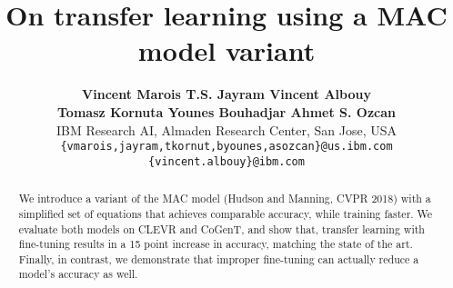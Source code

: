 \documentclass{article}
\title{On transfer learning using a MAC model variant}
\author{
	\textbf{\null\hfill Vincent Marois \hfill T.S. Jayram \hfill Vincent Albouy  \hfill\null}\\
	\textbf{\null\hfill Tomasz Kornuta \hfill Younes Bouhadjar \hfill Ahmet S. Ozcan \hfill\null}\\
	IBM Research AI, Almaden Research Center, San Jose, USA\\
	\texttt{\{vmarois,jayram,tkornut,byounes,asozcan\}@us.ibm.com}\\
	\texttt{\{vincent.albouy\}@ibm.com}\\
}
\begin{document}

\maketitle

\vskip -0.5cm
\begin{abstract}
We introduce a variant of the MAC model (Hudson and Manning, CVPR 2018) with a simplified set of equations that achieves comparable accuracy, while training faster. We evaluate both models on CLEVR and CoGenT, and show that, transfer learning with fine-tuning results in a 15 point increase in accuracy, matching the state of the art. Finally, in contrast, we demonstrate that improper fine-tuning can actually reduce a model's accuracy as well.
\end{abstract}






\newpage


\end{document}
